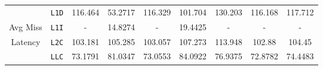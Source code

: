 \documentclass[11pt, swedish, openany]{book}
\begin{document}
\begin{table}[H]
\begin{tabular}{||c|c||c||c|c||c|c||c|c||}
        \hline
                                            & \texttt{L1D} & 116.464                   & 53.2717  & 116.329     & 101.704  & 130.203  & 116.168  & 117.712  \\
        Avg Miss                            & \texttt{L1I} & -                         & 14.8274  & -           & 19.4425  & -        & -        & -        \\
        Latency                             & \texttt{L2C} & 103.181                   & 105.285  & 103.057     & 107.273  & 113.948  & 102.88   & 104.45   \\
                                            & \texttt{LLC} & 73.1791                   & 81.0347  & 73.0553     & 84.0922  & 76.9375  & 72.8782  & 74.4483  \\
        \hline
    \end{tabular}
\end{table}
\end{document}
